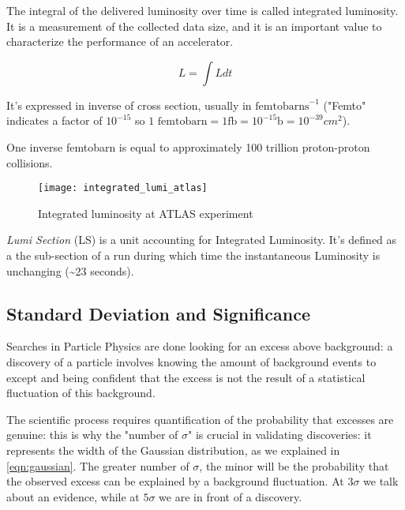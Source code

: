 The integral of the delivered luminosity over time is called integrated luminosity. It is a measurement of the collected data size, and it is an important value to characterize the performance of an accelerator.

\begin{equation}
	L = \int Ldt
\end{equation}

It's expressed in inverse of cross section, usually in $\text{femtobarns}^{-1}$ ("Femto" indicates a factor of $10^{-15}$ so $\text{1 femtobarn} = 1 \text{fb} = 10^{-15} \text{b} = 10^{-39} cm^2 $).

One inverse femtobarn is equal to approximately 100 trillion proton-proton collisions.

\begin{figure}
	\centerline{
		\texttt{[image: integrated\_lumi\_atlas]}}
	\caption{Integrated luminosity at ATLAS experiment \cite{Bruce:2016iew}}
\end{figure}

\textit{Lumi Section} (LS) \label{ls_def} is a unit accounting for Integrated Luminosity. It's defined as a the sub-section of a run during which time the instantaneous Luminosity is unchanging (\~{}23 seconds).

\subsection{Standard Deviation and Significance}

Searches in Particle Physics are done looking for an excess above background: a discovery of a particle involves knowing the amount of background events to except and being confident that the excess is not the result of a statistical fluctuation of this background.


The scientific process requires quantification of the probability that excesses are genuine: this is why the "number of $\sigma$" is crucial in validating discoveries: it represents the width of the Gaussian distribution, as we explained in \ref{eqn:gaussian}. The greater number of $\sigma$, the minor will be the probability that the observed excess can be explained by a background fluctuation.
At $3\sigma$ we talk about an evidence, while at $5\sigma$ we are in front of a discovery.


